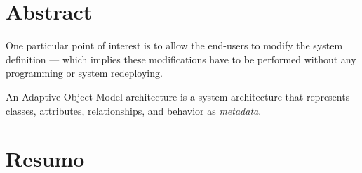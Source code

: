 \chapter*{Abstract}

One particular point of interest is to allow the end-users to modify the system definition --- which implies these modifications have to be performed without any programming or system redeploying.

An Adaptive Object-Model architecture is a system architecture that represents classes, attributes, relationships, and behavior as \emph{metadata}.

\chapter*{Resumo}


